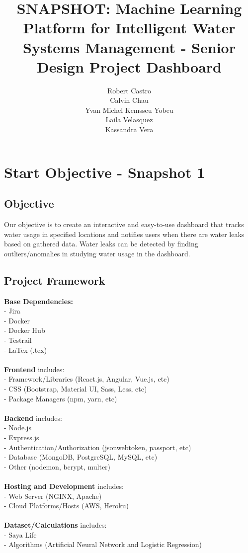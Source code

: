 \documentclass[10pt]{article}
\title{\textbf{SNAPSHOT}: Machine Learning Platform for Intelligent Water Systems Management - Senior Design Project Dashboard  }
\author{Robert Castro\\
Calvin Chau\\
Yvan Michel Kemsseu Yobeu\\
Laila Velasquez\\
Kassandra Vera}
\date{}
\begin{document}
\maketitle

\newpage

\section*{Start Objective - Snapshot 1}
\subsection*{Objective}
Our objective is to create an interactive and easy-to-use dashboard that tracks water usage in specified locations and notifies users when there are water leaks based on gathered data. Water leaks can be detected by finding outliers/anomalies in studying water usage in the dashboard.

\subsection*{Project Framework}
\textbf{Base Dependencies:}\\
- Jira\\
- Docker\\
- Docker Hub\\
- Testrail\\
- LaTex (.tex)\\
\\\textbf{Frontend} includes:\\
- Framework/Libraries (React.js, Angular, Vue.js, etc)\\
- CSS (Bootstrap, Material UI, Sass, Less, etc)\\
- Package Managers (npm, yarn, etc)\\
\\\textbf{Backend} includes:\\
- Node.js \\
- Express.js\\
- Authentication/Authorization (jsonwebtoken, passport, etc)\\
- Database (MongoDB, PostgreSQL, MySQL, etc)\\
- Other (nodemon, bcrypt, multer)\\
\\\textbf{Hosting and Development} includes:\\
- Web Server (NGINX, Apache)\\
- Cloud Platforms/Hosts (AWS, Heroku)\\
\\\textbf{Dataset/Calculations} includes:\\
- Saya Life\\
- Algorithms (Artificial Neural Network and Logistic Regression)
\end{document}

